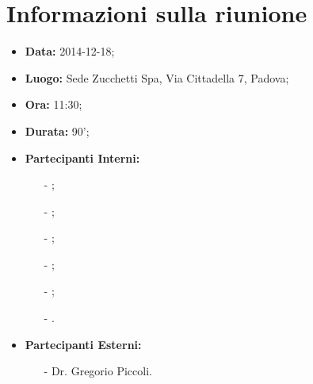 \section{Informazioni sulla riunione}
\begin{itemize}
	\item \textbf{Data:} 2014-12-18;
	\item \textbf{Luogo:} Sede Zucchetti Spa, Via Cittadella 7, Padova;
	\item \textbf{Ora:} 11:30;
	\item \textbf{Durata:} 90';
	\item \textbf{Partecipanti Interni:}
	\begin{itemize}
		\item[-] \CaMa;
		\item[-] \CoMa;
		\item[-] \DeEn;
		\item[-] \GoIs;
		\item[-] \ReAn;
		\item[-] \VeFe.
	\end{itemize}
	\item \textbf{Partecipanti Esterni:}
	\begin{itemize}
    	\item[-] Dr. Gregorio Piccoli.
    \end{itemize}
\end{itemize}